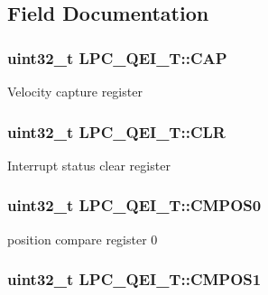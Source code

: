 \subsection{Field Documentation}
\hypertarget{structLPC__QEI__T_a3496f3632323f5c9b09c816f57b90b2d}{
\subsubsection[{C\-A\-P}]{ uint32\-\_\-t L\-P\-C\-\_\-\-Q\-E\-I\-\_\-\-T\-::\-C\-A\-P}}\label{structLPC__QEI__T_a3496f3632323f5c9b09c816f57b90b2d}
Velocity capture register \hypertarget{structLPC__QEI__T_a909f2a48a6a21651d6baf9a3a94e6cb0}{
\subsubsection[{C\-L\-R}]{ uint32\-\_\-t L\-P\-C\-\_\-\-Q\-E\-I\-\_\-\-T\-::\-C\-L\-R}}\label{structLPC__QEI__T_a909f2a48a6a21651d6baf9a3a94e6cb0}
Interrupt status clear register \hypertarget{structLPC__QEI__T_a4bb72cc566919075cb721bb123e72443}{
\subsubsection[{C\-M\-P\-O\-S0}]{ uint32\-\_\-t L\-P\-C\-\_\-\-Q\-E\-I\-\_\-\-T\-::\-C\-M\-P\-O\-S0}}\label{structLPC__QEI__T_a4bb72cc566919075cb721bb123e72443}
position compare register 0 \hypertarget{structLPC__QEI__T_ad1272dc00c77777af8e58d6ac3b94902}{
\subsubsection[{C\-M\-P\-O\-S1}]{ uint32\-\_\-t L\-P\-C\-\_\-\-Q\-E\-I\-\_\-\-T\-::\-C\-M\-P\-O\-S1}}\label{structLPC__QEI__T_ad1272dc00c77777af8e58d6ac3b94902}
